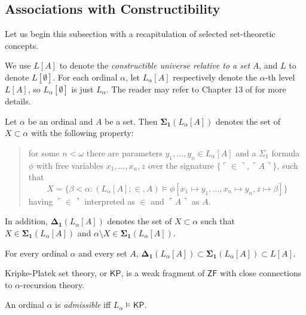 \documentclass[12pt]{article}
\numberwithin{equation}{section}
\begin{document}
\subsection{Associations with Constructibility}

Let us begin this subsection with a recapitulation of selected set-theoretic concepts.

\begin{defi}
We use $L[A]$ to denote the \emph{constructible universe relative to a set} $A$, and $L$ to denote $L[\emptyset]$. For each ordinal $\alpha$, let $L_{\alpha}[A]$ respectively denote the $\alpha$-th level $L[A]$, so $L_{\alpha}[\emptyset]$ is just $L_{\alpha}$. The reader may refer to Chapter 13 of \cite{jech} for more details.
\end{defi}

\begin{defi}
Let $\alpha$ be an ordinal and $A$ be a set. Then $\mathbf{\Sigma_1}(L_{\alpha}[A])$ denotes the set of $X \subset \alpha$ with the following property: 
\begin{quote}
    for some $n < \omega$ there are parameters $y_1, \dots, y_n \in L_{\alpha}[A]$ and a $\Sigma_1$ formula $\phi$ with free variables $x_1, \dots, x_{n}, z$ over the signature $\{\ulcorner \in \urcorner, \ulcorner A \urcorner\}$, such that 
    \begin{equation*}
        X = \{\beta < \alpha : (L_{\alpha}[A]; \in, A) \models \phi[x_1 \mapsto y_1, \dots, x_n \mapsto y_n, z \mapsto \beta]\}
    \end{equation*}
    having $\ulcorner \in \urcorner$ interpreted as $\in$ and $\ulcorner A \urcorner$ as $A$.
\end{quote}
In addition, $\mathbf{\Delta_1}(L_{\alpha}[A])$ denotes the set of $X \subset \alpha$ such that $X \in \mathbf{\Sigma_1}(L_{\alpha}[A])$ and $\alpha \setminus X \in \mathbf{\Sigma_1}(L_{\alpha}[A])$.
\end{defi}

\begin{fact}
For every ordinal $\alpha$ and every set $A$, $\mathbf{\Delta_1}(L_{\alpha}[A]) \subset \mathbf{\Sigma_1}(L_{\alpha}[A]) \subset L[A]$.
\end{fact}

Kripke-Platek set theory, or $\mathsf{KP}$, is a weak fragment of $\mathsf{ZF}$ with close connections to $\alpha$-recursion theory.

\begin{defi}
An ordinal $\alpha$ is \emph{admissible} iff $L_{\alpha} \models \mathsf{KP}$.
\end{defi}
\end{document}
